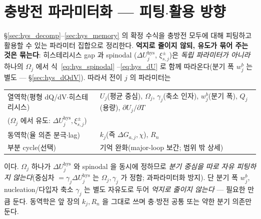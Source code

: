 \documentclass[11pt,a4paper]{article}
\newcommand{\hys}{\mathrm{hys}}
\begin{document}
\section{충방전 파라미터화 — 피팅$\cdot$활용 방향}\label{sec:hys_param}
\S\ref{sec:hys_decomp}--\ref{sec:hys_memory} 의 확정 수식을 충방전 모두에 대해 피팅하고 활용할 수 있는 파라미터
집합으로 정리한다. \textbf{억지로 줄이지 않되, 유도가 묶어 주는 것은 묶는다}: 히스테리시스 gap 과 spinodal
($\Delta U_j^\hys$, $\xi_{s,j}^\pm$)은 \emph{독립 파라미터가 아니라} 하나의 $\Omega_j$ 에서 식~\eqref{eq:hys_spinodal}
--\eqref{eq:hys_dU} 로 함께 따라온다(분기 폭 $w_j^b$ 는 별도 — \S\ref{sec:hys_dQdV}). 따라서 전이 $j$ 의 파라미터는
\begin{center}
\begin{tabular}{ll}
\toprule
열역학(평형 dQ/dV$\cdot$히스테리시스) & $U_j$(평균 중심), $\Omega_j$, $\gamma_j$(축소 인자), $w_j^b$(분기 폭), $Q_j$(용량), $\partial U_j/\partial T$ \\
\;\;($\Omega_j$ 에서 유도: $\Delta U_j^\hys,\xi_{s,j}^\pm$) & \\
동역학(율 의존 분극$\cdot$lag) & $k_j$(즉 $\Delta G_{a,j},\chi$), $R_n$ \\
부분 cycle(선택) & 기억 완화(major-loop 보간; 범위 밖 상세) \\
\bottomrule
\end{tabular}
\end{center}
이다. $\Omega_j$ 하나가 $\Delta U_j^\hys$ 와 spinodal 을 동시에 정하므로 \emph{분기 중심을 따로 자유 피팅하지
않는다}(중심차 $=\gamma_j\Delta U_j^\hys$ 는 $\Omega_j,\gamma_j$ 가 정함; 과파라미터화 방지). 단 분기 폭 $w_j^b$,
nucleation/다입자 축소 $\gamma_j$ 는 별도 자유도로 두어 \emph{억지로 줄이지 않는다} — 필요한 만큼 둔다. 동역학은
앞 장의 $k_j,R_n$ 을 그대로 쓰며 충$\cdot$방전 공통 또는 약한 분기 의존만 둔다.

\end{document}
